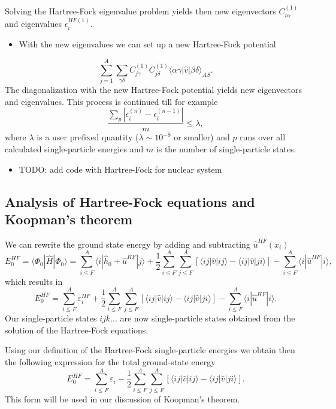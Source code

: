 \documentclass[%
twoside,                 %
final,                   %
10pt]{article}
\begin{document}
Solving the Hartree-Fock eigenvalue problem yields then new eigenvectors $C_{i\alpha}^{(1)}$ and eigenvalues
$\epsilon_i^{HF(1)}$. 
\begin{itemize}
 \item With the new eigenvalues we can set up a new Hartree-Fock potential 
\end{itemize}

\noindent
\[
\sum_{j = 1}^A\sum_{\gamma\delta} C_{j\gamma}^{(1)}C_{j\delta}^{(1)}\langle \alpha\gamma|\hat{v}|\beta\delta\rangle_{AS}.
\]
The diagonalization with the new Hartree-Fock potential yields new eigenvectors and eigenvalues.
This process is continued till for example
\[
\frac{\sum_{p} |\epsilon_i^{(n)}-\epsilon_i^{(n-1)}|}{m} \le \lambda,  
\]
where $\lambda$ is a user prefixed quantity ($\lambda \sim 10^{-8}$ or smaller) and $p$ runs over all calculated single-particle
energies and $m$ is the number of single-particle states.

\begin{itemize}
\item TODO: add code with Hartree-Fock for nuclear system
\end{itemize}

\noindent
\subsection*{Analysis of Hartree-Fock equations and Koopman's theorem}

We can rewrite the ground state energy by adding and subtracting $\hat{u}^{HF}(x_i)$ 
\[
  E_0^{HF} =\langle \Phi_0 | \hat{H} | \Phi_0\rangle = 
\sum_{i\le F}^A \langle i | \hat{h}_0 +\hat{u}^{HF}| j\rangle+ \frac{1}{2}\sum_{i\le F}^A\sum_{j \le F}^A\left[\langle ij |\hat{v}|ij \rangle-\langle ij|\hat{v}|ji\rangle\right]-\sum_{i\le F}^A \langle i |\hat{u}^{HF}| i\rangle,
\]
which results in
\[
  E_0^{HF}
  = \sum_{i\le F}^A \varepsilon_i^{HF} + \frac{1}{2}\sum_{i\le F}^A\sum_{j \le F}^A\left[\langle ij |\hat{v}|ij \rangle-\langle ij|\hat{v}|ji\rangle\right]-\sum_{i\le F}^A \langle i |\hat{u}^{HF}| i\rangle.
\]
Our single-particle states $ijk\dots$ are now single-particle states obtained from the solution of the Hartree-Fock equations.



Using our definition of the Hartree-Fock single-particle energies we obtain then the following expression for the total ground-state energy
\[
  E_0^{HF}
  = \sum_{i\le F}^A \varepsilon_i - \frac{1}{2}\sum_{i\le F}^A\sum_{j \le F}^A\left[\langle ij |\hat{v}|ij \rangle-\langle ij|\hat{v}|ji\rangle\right].
\]
This form will be used in our discussion of Koopman's theorem.
\end{document}
